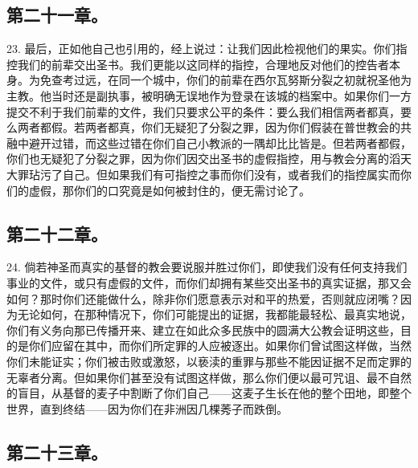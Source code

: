 
\subsection{第二十一章。}

23. 最后，正如他自己也引用的，经上说过：让我们因此检视他们的果实。你们指控我们的前辈交出圣书。我们更能以这同样的指控，合理地反对他们的控告者本身。为免查考过远，在同一个城中，你们的前辈在西尔瓦努斯分裂之初就祝圣他为主教。他当时还是副执事，被明确无误地作为登录在该城的档案中。如果你们一方提交不利于我们前辈的文件，我们只要求公平的条件：要么我们相信两者都真，要么两者都假。若两者都真，你们无疑犯了分裂之罪，因为你们假装在普世教会的共融中避开过错，而这些过错在你们自己小教派的一隅却比比皆是。但若两者都假，你们也无疑犯了分裂之罪，因为你们因交出圣书的虚假指控，用与教会分离的滔天大罪玷污了自己。但如果我们有可指控之事而你们没有，或者我们的指控属实而你们的虚假，那你们的口究竟是如何被封住的，便无需讨论了。\par


\subsection{第二十二章。}

24. 倘若神圣而真实的基督的教会要说服并胜过你们，即使我们没有任何支持我们事业的文件，或只有虚假的文件，而你们却拥有某些交出圣书的真实证据，那又会如何？那时你们还能做什么，除非你们愿意表示对和平的热爱，否则就应闭嘴？因为无论如何，在那种情况下，你们可能提出的证据，我都能最轻松、最真实地说，你们有义务向那已传播开来、建立在如此众多民族中的圆满大公教会证明这些，目的是你们应留在其中，而你们所定罪的人应被逐出。如果你们曾试图这样做，当然你们未能证实；你们被击败或激怒，以亵渎的重罪与那些不能因证据不足而定罪的无辜者分离。但如果你们甚至没有试图这样做，那么你们便以最可咒诅、最不自然的盲目，从基督的麦子中割断了你们自己——这麦子生长在他的整个田地，即整个世界，直到终结——因为你们在非洲因几棵莠子而跌倒。\par


\subsection{第二十三章。}

